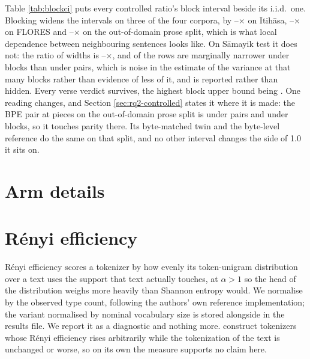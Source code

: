 \documentclass[11pt]{article}
\begin{document}
Table \ref{tab:blockci} puts every controlled ratio's block interval beside its i.i.d.\ one.
Blocking widens the intervals on three of the four corpora, by
\numBlockWidenItihasaLo--\numBlockWidenItihasaHi$\times$ on Itih\=asa,
\numBlockWidenFloresLo--\numBlockWidenFloresHi$\times$ on FLORES and
\numBlockWidenOodLo--\numBlockWidenOodHi$\times$ on the out-of-domain prose split, which is
what local dependence between neighbouring sentences looks like. On S\=amayik test it does
not: the ratio of widths is \numBlockWidenSamayikLo--\numBlockWidenSamayikHi$\times$, and
\numBlockNarrowerSamayik{} of the \numBlockRowsPerCorpus{} rows are marginally narrower
under blocks than under pairs, which is noise in the estimate of the variance at that many
blocks rather than evidence of less of it, and is reported rather than hidden. Every verse
verdict survives, the highest block upper bound being \numBlockItihasaMaxUpper. One reading
changes, and Section \ref{sec:rq2-controlled} states it where it is made: the BPE pair at
\numVocabHuge{} pieces on the out-of-domain prose split is \numTppBpeHugeOod{}
\numTppBpeHugeOodCi{} under pairs and \numTppBpeHugeOodBlockCi{} under blocks, so it touches
parity there. Its byte-matched twin and the byte-level reference do the same on that split,
and no other interval changes the side of 1.0 it sits on.



\section{Arm details}
\label{sec:arms}



\section{R\'enyi efficiency}
\label{sec:renyi}

R\'enyi efficiency \citep{zouhar-etal-2023-tokenization} scores a tokenizer by how evenly
its token-unigram distribution over a text uses the support that text actually touches, at
$\alpha > 1$ so the head of the distribution weighs more heavily than Shannon entropy
would. We normalise by the observed type count, following the authors' own reference
implementation; the variant normalised by nominal vocabulary size is stored alongside in
the results file. We report it as a diagnostic and nothing more.
\citet{cognetta-etal-2024-counterexamples} construct tokenizers whose R\'enyi efficiency
rises arbitrarily while the tokenization of the text is unchanged or worse, so on its own
the measure supports no claim here.
\end{document}
